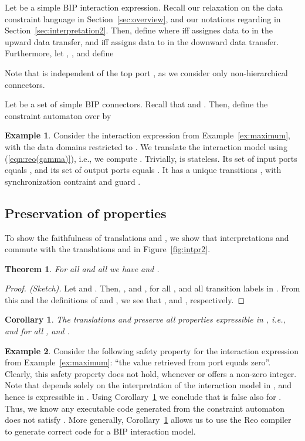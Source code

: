 \documentclass[submission,copyright,creativecommons,hidelinks]{eptcs}
\theoremstyle{plain} \newtheorem{theorem}{Theorem}
\newtheorem{corollary}{Corollary}
\theoremstyle{definition}
\newtheorem{example}{Example}
\theoremstyle{remark}
\newcommand\xqed[1]{\leavevmode\unskip\penalty9999 \hbox{}\nobreak\hfill
  \quad\hbox{#1}}
\newcommand\tri{\xqed{}}
\newcommand{\fig}[2][]{Figure~\ref{fig:#2}\ensuremath{#1}}
\newcommand{\eq}[1]{(\ref{eqn:#1})}
\newcommand{\ex}[1]{Example~\ref{ex:#1}}
\newcommand{\secn}[1]{Section~\ref{sec:#1}}
\newcommand{\cor}[1]{Corollary~\ref{cor:#1}}
\begin{document}
Let  be a simple BIP interaction expression. 
Recall our relaxation on the data constraint language in \secn{overview}, and our notations regarding  in \secn{interpretation2}.
Then, define 
where  iff  assignes data to  in the upward data transfer, and  iff  assigns data to  in the downward data transfer.
Furthermore, let , , and define
 
Note that  is independent of the top port , as we consider only non-hierarchical connectors.

Let  be a set of simple BIP connectors. Recall that  and . Then, define the constraint automaton  over  by 


\begin{example}
\label{ex:bip2reodata}
Consider the interaction expression  from \ex{maximum}, with the data domains restricted to . We translate the interaction model  using \eq{reo(gamma)}, i.e., we compute . Trivially,  is stateless. Its set of input ports equals , and its set of output ports equals . It has a unique transitions , with synchronization contraint  and guard
.
\tri\end{example}

\subsection{Preservation of properties}

To show the faithfulness of translations  and , we show that interpretations  and  commute with the translations  and  in \fig{intpr2}.

\begin{theorem} 
\label{thm:commute_b}
For all  and all  we have  and .
\end{theorem}

\begin{proof}[Proof. (Sketch)]
Let  and . Then, , and , for all , and all transition labels  in . From this and the definitions of  and , we see that , and , respectively.
\end{proof}

\begin{corollary}
\label{cor:props_ca2setssimplecon}
   The translations  and  preserve all properties expressible in , i.e.,  and  for all ,  and .
\end{corollary}

\begin{example}
Consider the following safety property  for the interaction expression  from \ex{maximum}: ``the value retrieved from port  equals zero''.  Clearly, this safety property does not hold, whenever  or  offers a non-zero integer. 
Note that  depends solely on the interpretation of the interaction model  in , and hence  is expressible in .
Using \cor{props_ca2setssimplecon} we conclude that  is false also for .
Thus, we know any executable code generated from the constraint automaton  does not satisfy . More generally, \cor{props_ca2setssimplecon} allows us to use the Reo compiler to generate correct code for a BIP interaction model.
\tri\end{example}
\end{document}
